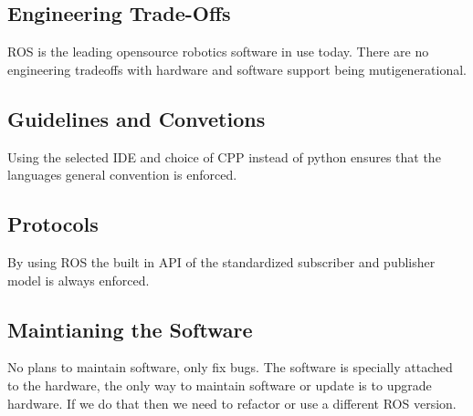 \subsection{Engineering Trade-Offs}
\label{sec:tradeoffs}

ROS is the leading opensource robotics software in use today. There are no
engineering tradeoffs with hardware and software support being
mutigenerational. 
\par

\subsection{Guidelines and Convetions}
\label{sec:guidelines}

Using the selected IDE and choice of CPP instead of python ensures that the
languages general convention is enforced.
\par

\subsection{Protocols}
\label{sec:protocols}

By using ROS the built in API of the standardized subscriber and publisher
model is always enforced.
\par

\subsection{Maintianing the Software}
\label{sec:maintain}

No plans to maintain software, only fix bugs. The software is specially
attached to the hardware, the only way to maintain software or update is to
upgrade hardware. If we do that then we need to refactor or use a different ROS
version.
\par

